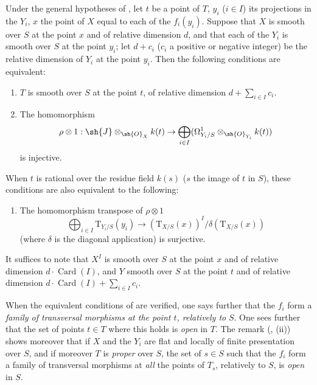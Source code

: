\begin{corollary}[17.13.10]
\label{IV.17.13.10}
Under the general hypotheses of , let $t$ be a point of $T$, $y_i$ ($i\in I$) its projections in the $Y_i$, $x$ the point of $X$ equal to each of the $f_i(y_i)$.
Suppose that $X$ is smooth over $S$ at the point $x$ and of relative dimension $d$, and that each of the $Y_i$ is smooth over $S$ at the point $y_i$; let $d+c_i$ ($c_i$ a positive or negative integer) be the relative dimension of $Y_i$ at the point $y_i$.
Then the following conditions are equivalent:
\begin{enumerate}[label=\alph*)]
  \item $T$ is smooth over $S$ at the point $t$, of relative dimension $d+\sum_{i\in I} c_i$.
  \item The homomorphism
  \[
    \rho\otimes 1: \sh{J}\otimes_{\sh{O}_X}k(t) \to \bigoplus_{i\in I}(\Omega^1_{Y_i/S}\otimes_{\sh{O}_{Y_i}}k(t))
  \]
  is injective.
\end{enumerate}
When $t$ is rational over the residue field $k(s)$ ($s$ the image of $t$ in $S$), these conditions are also equivalent to the following:
\begin{enumerate}
  \item[b${}'$)] The homomorphism transpose of $\rho\otimes 1$
  \[
    \bigoplus_{i\in I}\mathrm{T}_{Y_i/S}(y_i) \to (\mathrm{T}_{X/S}(x))^I/\delta(\mathrm{T}_{X/S}(x))
  \]
  (where $\delta$ is the diagonal application) is surjective.
\end{enumerate}
It suffices to note that $X^I$ is smooth over $S$ at the point $x$ and of relative dimension $d\cdot\operatorname{Card}(I)$, and $Y$ smooth over $S$ at the point $t$ and of relative dimension $d\cdot\operatorname{Card}(I)+\sum_{i\in I} c_i$.

When the equivalent conditions of  are verified, one says further that the $f_i$ form a \emph{family of transversal morphisms at the point $t$, relatively to} $S$.
One sees further that the set of points $t\in T$ where this holds is \emph{open} in $T$.
The remark (, (ii)) shows moreover that if $X$ and the $Y_i$ are flat and locally of finite presentation over $S$, and if moreover $T$ is \emph{proper} over $S$, the set of $s\in S$ such that the $f_i$ form a family of transversal morphisms at \emph{all} the points of $T_s$, relatively to $S$, is \emph{open} in $S$.
\end{corollary}

